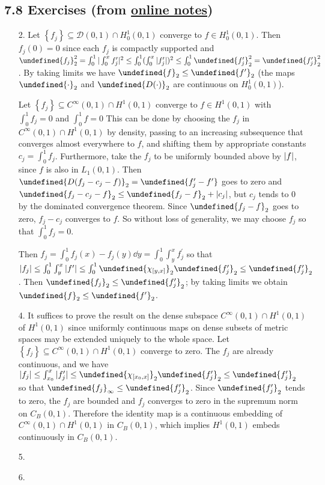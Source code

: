 \documentclass[11pt,leqno]{article}
\theoremstyle{plain}
\theoremstyle{definition}
\numberwithin{equation}{section}
\numberwithin{lem}{section}
\newcommand{\cbr}[1]{\left\{#1\right\}}
\let\norm\undefined %
\DeclarePairedDelimiter\norm{\lVert}{\rVert}
\begin{document}
\subsection*{7.8 Exercises (from \href{https://users.oden.utexas.edu/~arbogast/appMath08c.pdf}{online notes})}
\begin{enumerate}
    \item[2.] Let $\cbr{f_j}\subseteq \mathcal D(0,1)\cap H^1_0(0,1)$ converge to $f\in H^1_0(0,1)$. Then $f_j(0) = 0$ since each $f_j$ is compactly supported and $\norm{f_j}_2^2 = \int_0^1|\int_0^x f_j^\prime|^2\leq \int_0^1(\int_0^x|f_j^\prime|)^2\leq \int_0^1\norm{f_j^\prime}_2^2 = \norm{f_j^\prime}_2^2$. By taking limits we have $\norm{f}_2\leq \norm{f^\prime}_2$ (the maps $\norm{\cdot}_2$ and $\norm{D(\cdot)}_2$ are continuous on $H^1_0(0,1)$).
    
    Let $\cbr{f_j}\subseteq C^\infty(0,1)\cap H^1(0,1)$ converge to $f\in H^1(0,1)$ with $\int_0^1f_j = 0$ and $\int_0^1f = 0$ This can be done by choosing the $f_j$ in $C^\infty(0,1)\cap H^1(0,1)$ by density, passing to an increasing subsequence that converges almost everywhere to $f$, and shifting them by appropriate constants $c_j = \int_0^1 f_j$. Furthermore, take the $f_j$ to be uniformly bounded above by $\abs{f}$, since $f$ is also in $L_1(0,1)$. Then $\norm{D(f_j-c_j-f)}_2 = \norm{f_j^\prime-f^\prime}$ goes to zero and $\norm{f_j-c_j-f}_2\leq \norm{f_j-f}_2 + \abs{c_j}$, but $c_j$ tends to $0$ by the dominated convergence theorem. Since $\norm{f_j-f}_2$ goes to zero, $f_j-c_j$ converges to $f$. So without loss of generality, we may choose $f_j$ so that $\int_0^1 f_j = 0$.
    
    Then $f_j = \int_0^1f_j(x) - f_j(y)\dd y = \int_0^1\int_y^x f_j^\prime$ so that $\abs{f_j} \leq \int_0^1\int_y^x \abs{f^\prime}\leq \int_0^1\norm{\chi_{[y,x]}}_2\norm{f_j^\prime}_2\leq \norm{f_j^\prime}_2$. Then $\norm{f_j}_2 \leq \norm{f_j^\prime}_2$; by taking limits we obtain $\norm{f}_2\leq \norm{f^\prime}_2$.
    \item[4.] It suffices to prove the result on the dense subspace $C^\infty(0,1)\cap H^1(0,1)$ of $H^1(0,1)$ since uniformly continuous maps on dense subsets of metric spaces may be extended uniquely to the whole space. Let $\cbr{f_j}\subseteq C^\infty(0,1)\cap H^1(0,1)$ converge to zero. The $f_j$ are already continuous, and we have $\abs{f_j}\leq \int_{x_0}^x|f_j^\prime|\leq \norm{\chi_{[x_0,x]}}_2\norm{f_j^\prime}_2 \leq \norm{f_j^\prime}_2$ so that $\norm{f_j}_\infty\leq \norm{f_j^\prime}_2$. Since $\norm{f_j^\prime}_2$ tends to zero, the $f_j$ are bounded and $f_j$ converges to zero in the supremum norm on $C_B(0,1)$. Therefore the identity map is a continuous embedding of $C^\infty(0,1)\cap H^1(0,1)$ in $C_B(0,1)$, which implies $H^1(0,1)$ embeds continuously in $C_B(0,1)$.
    \item[5.] 
    \item[6.] 
\end{enumerate}
\end{document}
